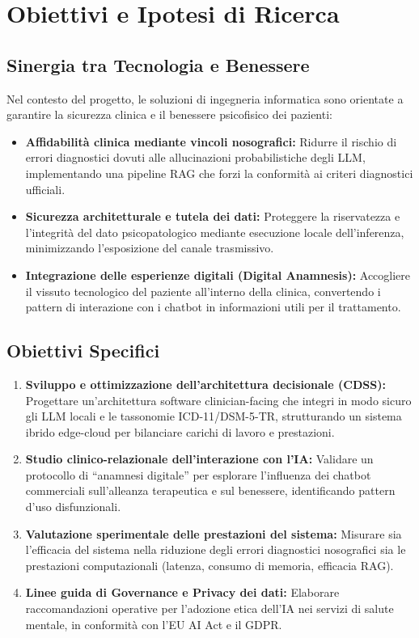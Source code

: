 \documentclass[11pt,a4paper]{article}
\begin{document}
\section{Obiettivi e Ipotesi di Ricerca}

\subsection{Sinergia tra Tecnologia e Benessere}
Nel contesto del progetto, le soluzioni di ingegneria informatica sono orientate a garantire la sicurezza clinica e il benessere psicofisico dei pazienti:
\begin{itemize}
    \item \textbf{Affidabilità clinica mediante vincoli nosografici:} Ridurre il rischio di errori diagnostici dovuti alle allucinazioni probabilistiche degli LLM, implementando una pipeline RAG che forzi la conformità ai criteri diagnostici ufficiali.
    \item \textbf{Sicurezza architetturale e tutela dei dati:} Proteggere la riservatezza e l'integrità del dato psicopatologico mediante esecuzione locale dell'inferenza, minimizzando l'esposizione del canale trasmissivo.
    \item \textbf{Integrazione delle esperienze digitali (Digital Anamnesis):} Accogliere il vissuto tecnologico del paziente all'interno della clinica, convertendo i pattern di interazione con i chatbot in informazioni utili per il trattamento.
\end{itemize}

\subsection{Obiettivi Specifici}
\begin{enumerate}
    \item \textbf{Sviluppo e ottimizzazione dell'architettura decisionale (CDSS):} Progettare un'architettura software clinician-facing che integri in modo sicuro gli LLM locali e le tassonomie ICD-11/DSM-5-TR, strutturando un sistema ibrido edge-cloud per bilanciare carichi di lavoro e prestazioni.
    \item \textbf{Studio clinico-relazionale dell'interazione con l'IA:} Validare un protocollo di ``anamnesi digitale'' per esplorare l'influenza dei chatbot commerciali sull'alleanza terapeutica e sul benessere, identificando pattern d'uso disfunzionali.
    \item \textbf{Valutazione sperimentale delle prestazioni del sistema:} Misurare sia l'efficacia del sistema nella riduzione degli errori diagnostici nosografici sia le prestazioni computazionali (latenza, consumo di memoria, efficacia RAG).
    \item \textbf{Linee guida di Governance e Privacy dei dati:} Elaborare raccomandazioni operative per l'adozione etica dell'IA nei servizi di salute mentale, in conformità con l'EU AI Act e il GDPR.
\end{enumerate}
\end{document}
